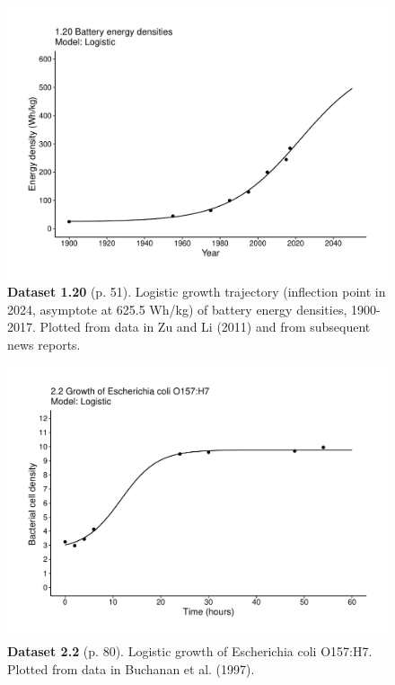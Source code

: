 \documentclass[aps,rmp,preprint,superscriptaddress,10pt,onecolumn]{article}
\begin{document}
\clearpage
\begin{figure}[h]
\includegraphics[width=\textwidth]{output/figs-ggplot/1.20.pdf}
\caption*{\textbf{Dataset 1.20} (p. 51). Logistic growth trajectory (inflection point in 2024, asymptote at 625.5 Wh/kg) of battery energy densities, 1900-2017. Plotted from data in Zu and Li (2011) and from subsequent news reports. }
\end{figure}
	
\clearpage
\begin{figure}[h]
\includegraphics[width=\textwidth]{output/figs-ggplot/2.2.pdf}
\caption*{\textbf{Dataset 2.2} (p. 80). Logistic growth of Escherichia coli O157:H7. Plotted from data in Buchanan et al. (1997).}
\end{figure}
	
\end{document}
